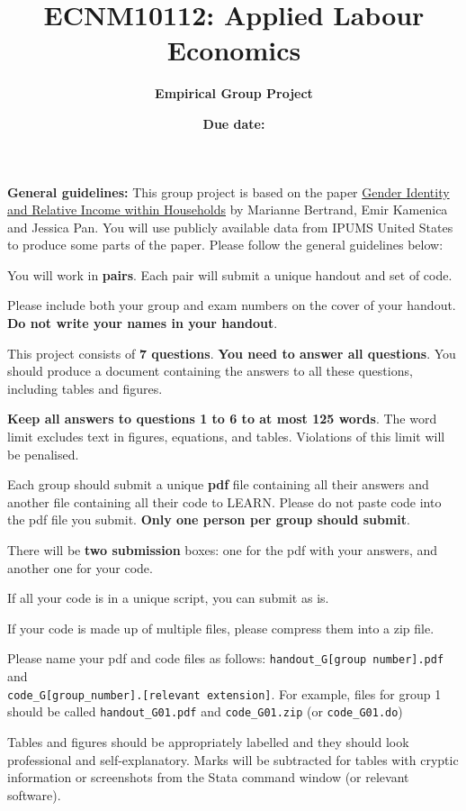\documentclass[a4paper, 11pt,addpoints]{exam}
\title{\large{\textbf{ECNM10112: Applied Labour Economics}}}
\author{\textbf{Empirical Group Project}}
\date{\textbf{Due date:} \red{\textbf{Thursday,  6  November at 3 pm}}}
\begin{document}
\maketitle

\noindent\textbf{General guidelines:} This group project is based on the paper \href{https://academic.oup.com/qje/article/130/2/571/2330321}{Gender Identity and Relative Income within Households} by Marianne Bertrand, Emir Kamenica and Jessica Pan\nocite{Bertrand2015}. You will use publicly available data from IPUMS United States to produce some parts of the paper. Please follow the general guidelines below:

\bitem 
\item You will work in \textbf{pairs}. Each pair will submit a unique handout and set of code.
\item Please include both your group and exam numbers on the cover of your handout. \textbf{Do not write your names in your handout}.
\item This project consists of \textbf{7 questions}. \textbf{You need to answer all questions}. You should produce a document containing the answers to all these questions, including tables and figures.
\item \textbf{Keep all answers to questions 1 to 6 to at most 125 words}. The word limit excludes text in figures, equations, and tables. Violations of this limit will be penalised.
\item Each group should submit a unique \textbf{pdf} file containing all their answers and another file containing all their code to LEARN. Please do not paste code into the pdf file you submit. \textbf{Only one person per group should submit}.
\item There will be \textbf{two submission} boxes: one for the pdf with your answers, and another one for your code.
\bitem 
    \item If all your code is in a unique script, you can submit as is.
    \item If your code is made up of multiple files, please compress them into a zip file.
\eitem 
\item Please name your pdf and code files as follows: {\tt handout\_G[group number].pdf} and \\ {\tt code\_G[group\_number].[relevant extension]}. For example, files for group 1 should be called {\tt handout\_G01.pdf} and {\tt code\_G01.zip} (or {\tt code\_G01.do})
\item Tables and figures should be appropriately labelled and they should look professional and self-explanatory. Marks will be subtracted for tables with cryptic information or screenshots from the Stata  command window (or relevant software).
\end{document}
